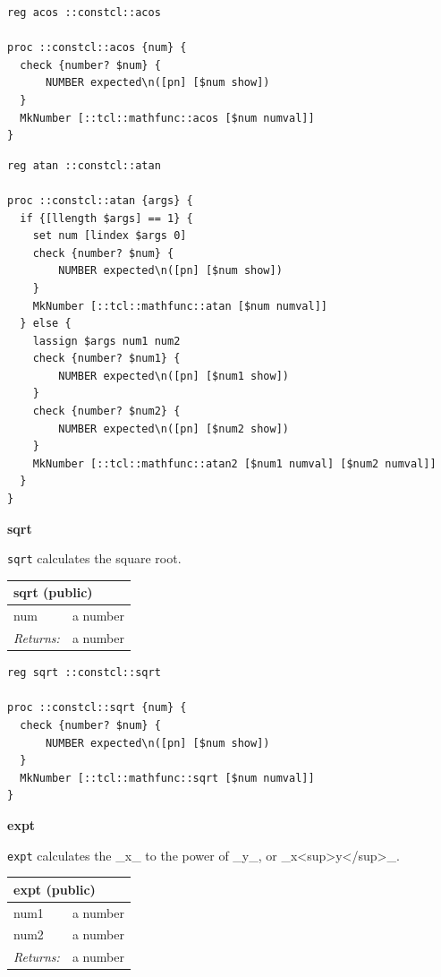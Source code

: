 \documentclass[twoside,9pt]{report}
\begin{document}
\noindent\makebox[\linewidth]{\rule{\linewidth}{0.4pt}}
\noindent\makebox[\linewidth]{\rule{\linewidth}{0.4pt}}
\begin{lstlisting}
reg acos ::constcl::acos
 
proc ::constcl::acos {num} {
  check {number? $num} {
      NUMBER expected\n([pn] [$num show])
  }
  MkNumber [::tcl::mathfunc::acos [$num numval]]
}
\end{lstlisting}
\noindent\makebox[\linewidth]{\rule{\linewidth}{0.4pt}}
\noindent\makebox[\linewidth]{\rule{\linewidth}{0.4pt}}
\begin{lstlisting}
reg atan ::constcl::atan
 
proc ::constcl::atan {args} {
  if {[llength $args] == 1} {
    set num [lindex $args 0]
    check {number? $num} {
        NUMBER expected\n([pn] [$num show])
    }
    MkNumber [::tcl::mathfunc::atan [$num numval]]
  } else {
    lassign $args num1 num2
    check {number? $num1} {
        NUMBER expected\n([pn] [$num1 show])
    }
    check {number? $num2} {
        NUMBER expected\n([pn] [$num2 show])
    }
    MkNumber [::tcl::mathfunc::atan2 [$num1 numval] [$num2 numval]]
  }
}
\end{lstlisting}
\noindent\makebox[\linewidth]{\rule{\linewidth}{0.4pt}}

\textbf{sqrt}


\texttt{sqrt} calculates the square root.

\begin{tabular}{ |l l| }
\hline
\multicolumn{2}{|l|}{sqrt (public)} \\
\hline
num & a number \\
\textit{Returns:} & a number \\
\hline
\end{tabular}

\noindent\makebox[\linewidth]{\rule{\linewidth}{0.4pt}}
\begin{lstlisting}
reg sqrt ::constcl::sqrt
 
proc ::constcl::sqrt {num} {
  check {number? $num} {
      NUMBER expected\n([pn] [$num show])
  }
  MkNumber [::tcl::mathfunc::sqrt [$num numval]]
}
\end{lstlisting}
\noindent\makebox[\linewidth]{\rule{\linewidth}{0.4pt}}

\textbf{expt}


\texttt{expt} calculates the \_x\_ to the power of \_y\_, or \_x<sup>y</sup>\_.

\begin{tabular}{ |l l| }
\hline
\multicolumn{2}{|l|}{expt (public)} \\
\hline
num1 & a number \\
num2 & a number \\
\textit{Returns:} & a number \\
\hline
\end{tabular}
\end{document}
